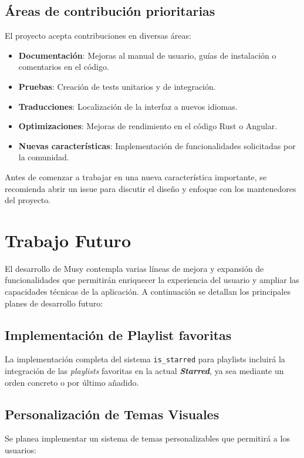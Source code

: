 \documentclass[11pt, a4paper]{article}
\begin{document}
  \subsection{Áreas de contribución prioritarias}

  El proyecto acepta contribuciones en diversas áreas:

  \begin{itemize}
    \item \textbf{Documentación}: Mejoras al manual de usuario, guías de instalación o comentarios en el código.
    \item \textbf{Pruebas}: Creación de tests unitarios y de integración.
    \item \textbf{Traducciones}: Localización de la interfaz a nuevos idiomas.
    \item \textbf{Optimizaciones}: Mejoras de rendimiento en el código Rust o Angular.
    \item \textbf{Nuevas características}: Implementación de funcionalidades solicitadas por la comunidad.
  \end{itemize}

  Antes de comenzar a trabajar en una nueva característica importante, se recomienda abrir un issue para discutir el diseño y enfoque con los mantenedores del proyecto.

\section{Trabajo Futuro}

El desarrollo de Musy contempla varias líneas de mejora y expansión de funcionalidades que permitirán enriquecer la experiencia del usuario y ampliar las capacidades técnicas de la aplicación. A continuación se detallan los principales planes de desarrollo futuro:

  \subsection{Implementación de Playlist favoritas}

  La implementación completa del sistema \texttt{is\_starred} para playlists incluirá la integración de las \textit{playlists} favoritas en la actual \textbf{\textit{Starred}}, ya sea mediante un orden concreto o por último añadido.

  \subsection{Personalización de Temas Visuales}
  Se planea implementar un sistema de temas personalizables que permitirá a los usuarios:
\end{document}
